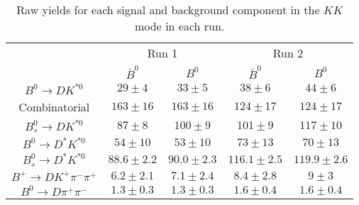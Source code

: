 \begin{table}
  \centering
  \begin{tabular}{ccccc}
      \toprule
       & \multicolumn{2}{c}{Run 1} & \multicolumn{2}{c}{Run 2} \\
      & $\bar{B}^0$ & $B^0$& $\bar{B}^0$ & $B^0$ \\
      \midrule
      $B^0 \to DK^{*0}$ & $29 \pm 4$ & $33 \pm 5$ & $38 \pm 6$ & $44 \pm 6$ \\
      Combinatorial & $163 \pm 16$ & $163 \pm 16$ & $124 \pm 17$ & $124 \pm 17$ \\
      $B^0_s \to DK^{*0}$ & $87 \pm 8$ & $100 \pm 9$ & $101 \pm 9$ & $117 \pm 10$ \\
      $B^0 \to D^*K^{*0}$ & $54 \pm 10$ & $53 \pm 10$ & $73 \pm 13$ & $70 \pm 13$ \\
      $B^0_s \to D^*K^{*0}$ & $88.6 \pm 2.2$ & $90.0 \pm 2.3$ & $116.1 \pm 2.5$ & $119.9 \pm 2.6$ \\
      $B^+ \to DK^+\pi^-\pi^+$ & $6.2 \pm 2.1$ & $7.1 \pm 2.4$ & $8.4 \pm 2.8$ & $9 \pm 3$ \\
      $B^0 \to D\pi^+\pi^-$ & $1.3 \pm 0.3$ & $1.3 \pm 0.3$ & $1.6 \pm 0.4$ & $1.6 \pm 0.4$ \\
      \bottomrule
      \end{tabular}
\caption{Raw yields for each signal and background component in the $KK$ mode in each run.}
\label{tab:yields_KK}
\end{table}
